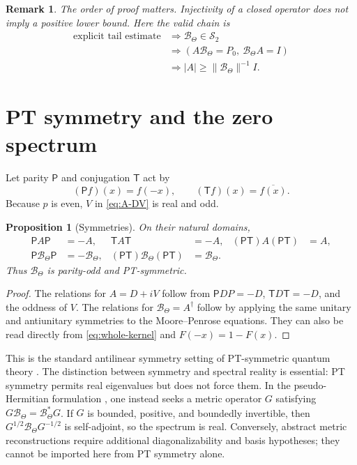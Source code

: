 \documentclass[11pt,reqno]{amsart}
\numberwithin{equation}{section}
\newtheorem{proposition}[proposition]{Proposition}
\newtheorem{remark}[remark]{Remark}
\newcommand{\1}{\mathbf 1}
\newcommand{\HS}{\mathcal S_2}
\newcommand{\BTheta}{\mathcal B_{\Theta}}
\begin{document}
\begin{remark}\label{rem:no-kernel-shortcut}
The order of proof matters.  Injectivity of a closed operator does not imply a
positive lower bound.  Here the valid chain is
\begin{align*}
 \text{explicit tail estimate}
 &\Longrightarrow \BTheta\in\HS\\
 &\Longrightarrow (A\BTheta=P_0,\ \BTheta A=I)\\
 &\Longrightarrow |A|\geq\|\BTheta\|^{-1}I.
\end{align*}
\end{remark}

\section{PT symmetry and the zero spectrum}

Let parity $\mathsf P$ and conjugation $\mathsf T$ act by
\begin{equation}\label{eq:PT-def}
 (\mathsf Pf)(x)=f(-x),
 \qquad
 (\mathsf Tf)(x)=\overline{f(x)}.
\end{equation}
Because $p$ is even, $V$ in \eqref{eq:A-DV} is real and odd.

\begin{proposition}[Symmetries]\label{prop:PT}
On their natural domains,
\begin{align}
 \mathsf P A\mathsf P&=-A,
 &\mathsf T A\mathsf T&=-A,
 &(\mathsf P\mathsf T)A(\mathsf P\mathsf T)&=A,
 \label{eq:A-PT}\\
 \mathsf P\BTheta\mathsf P&=-\BTheta,
 &(\mathsf P\mathsf T)\BTheta(\mathsf P\mathsf T)&=\BTheta.
 \label{eq:B-PT}
\end{align}
Thus $\BTheta$ is parity-odd and PT-symmetric.
\end{proposition}

\begin{proof}
The relations for $A=D+iV$ follow from
$\mathsf PDP=-D$, $\mathsf T D\mathsf T=-D$, and the oddness of $V$.
The relations for $\BTheta=A^\dagger$ follow by applying the same unitary and
antiunitary symmetries to the Moore--Penrose equations.  They can also be read
directly from \eqref{eq:whole-kernel} and $F(-x)=1-F(x)$.
\end{proof}

This is the standard antilinear symmetry setting of PT-symmetric quantum
theory \cite{BenderBoettcher1998}.  The distinction between symmetry and
spectral reality is essential: PT symmetry permits real eigenvalues but does
not force them.  In the pseudo-Hermitian formulation
\cite{Mostafazadeh2002,Mostafazadeh2002III}, one instead seeks a metric
operator $G$ satisfying $G\BTheta=\BTheta^*G$.  If $G$ is bounded, positive,
and boundedly invertible, then $G^{1/2}\BTheta G^{-1/2}$ is self-adjoint, so
the spectrum is real.  Conversely, abstract metric reconstructions require
additional diagonalizability and basis hypotheses; they cannot be imported
here from PT symmetry alone.
\end{document}
